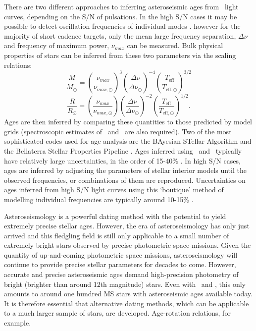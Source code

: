 There are two different approaches to inferring asteroseismic ages from
\kepler\ light curves, depending on the S/N of pulsations.
In the high S/N cases it may be possible to detect oscillation frequencies of
individual modes \citep[\eg][]{Lebreton2014, Metcalfe2010, Silva-aguirre2012}.
however for the majority of short cadence targets, only the
mean large frequency separation, $\Delta\nu$ and frequency of maximum power,
$\nu_{max}$ can be measured.
Bulk physical properties of stars can be inferred from these two parameters
via the scaling relations:
\begin{equation}
    \frac{M}{M_\odot} = \left(\frac{\nu_{max}}{\nu_{max,\odot}}\right)^3
    \left(\frac{\Delta\nu}{\Delta\nu_\odot}\right)^{-4}
    \left(\frac{T_{\mathrm{eff}}}{T_{\mathrm{eff},\odot}}\right)^{3/2}
\end{equation}
\begin{equation}
    \frac{R}{R_\odot} = \left(\frac{\nu_{max}}{\nu_{max,\odot}}\right)
    \left(\frac{\Delta\nu}{\Delta\nu_\odot}\right)^{-2}
    \left(\frac{T_{\mathrm{eff}}}{T_{\mathrm{eff},\odot}}\right)^{1/2}.
\end{equation}
Ages are then inferred by comparing these quantities to those predicted by
model grids (spectroscopic estimates of \teff\ and \feh\ are also required).
Two of the most sophisticated codes used for age analysis are the BAyesian
STellar Algorithm \citep[BASTA][]{Silva-aguirre2015} and the Bellaterra
Stellar Properties Pipeline \citep{Serenelli2013}.
Ages inferred using \dnu\ and \numax\ typically have relatively large
uncertainties, in the order of 15-40\% \citep{Silva-aguirre2015a}.
In high S/N cases, ages are inferred by adjusting the parameters of stellar
interior models \citep[\eg][]{Kjeldsen2008} until the observed frequencies, or
combinations of them are reproduced.
Uncertainties on ages inferred from high S/N light curves using this
`boutique' method of modelling individual frequencies are typically around
10-15\% \citep{Silva-aguirre2015a}.

Asteroseismology is a powerful dating method with the potential to yield
extremely precise stellar ages.
However, the era of asteroseismology has only just arrived and this fledgling
field is still only applicable to a small number of extremely bright stars
observed by precise photometric space-missions.
Given the quantity of up-and-coming photometric space missions,
asteroseismology will continue to provide precise stellar parameters for
decades to come.
However, accurate and precise asteroseismic ages demand high-precision
photometry of bright (brighter than around 12th magnitude) stars.
Even with \kepler\ and \corot, this only amounts to around one hundred MS
stars with asteroseismic ages available today.
It is therefore essential that alternative dating methods, which can be
applicable to a much larger sample of stars, are developed.
Age-rotation relations, for example.

